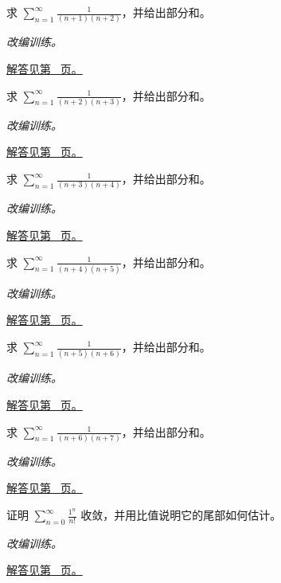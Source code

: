 \documentclass[UTF8,12pt,a4paper,fontset=fandol]{ctexart}
\begin{document}
\begin{example}[裂项求和]\label{ex:c24q7}
求 $\displaystyle\sum_{n=1}^\infty\frac{1}{(n+1)(n+2)}$，并给出部分和。
\par\textit{改编训练。}\par\hyperref[ans:c24q7]{解答见第~\pageref{ans:c24q7} 页。}
\end{example}
\begin{example}[裂项求和]\label{ex:c24q8}
求 $\displaystyle\sum_{n=1}^\infty\frac{1}{(n+2)(n+3)}$，并给出部分和。
\par\textit{改编训练。}\par\hyperref[ans:c24q8]{解答见第~\pageref{ans:c24q8} 页。}
\end{example}
\begin{example}[裂项求和]\label{ex:c24q9}
求 $\displaystyle\sum_{n=1}^\infty\frac{1}{(n+3)(n+4)}$，并给出部分和。
\par\textit{改编训练。}\par\hyperref[ans:c24q9]{解答见第~\pageref{ans:c24q9} 页。}
\end{example}
\begin{example}[裂项求和]\label{ex:c24q10}
求 $\displaystyle\sum_{n=1}^\infty\frac{1}{(n+4)(n+5)}$，并给出部分和。
\par\textit{改编训练。}\par\hyperref[ans:c24q10]{解答见第~\pageref{ans:c24q10} 页。}
\end{example}
\begin{example}[裂项求和]\label{ex:c24q11}
求 $\displaystyle\sum_{n=1}^\infty\frac{1}{(n+5)(n+6)}$，并给出部分和。
\par\textit{改编训练。}\par\hyperref[ans:c24q11]{解答见第~\pageref{ans:c24q11} 页。}
\end{example}
\begin{example}[裂项求和]\label{ex:c24q12}
求 $\displaystyle\sum_{n=1}^\infty\frac{1}{(n+6)(n+7)}$，并给出部分和。
\par\textit{改编训练。}\par\hyperref[ans:c24q12]{解答见第~\pageref{ans:c24q12} 页。}
\end{example}
\begin{example}[阶乘压过指数]\label{ex:c24q13}
证明 $\displaystyle\sum_{n=0}^\infty\frac{1^n}{n!}$ 收敛，并用比值说明它的尾部如何估计。
\par\textit{改编训练。}\par\hyperref[ans:c24q13]{解答见第~\pageref{ans:c24q13} 页。}
\end{example}
\end{document}
